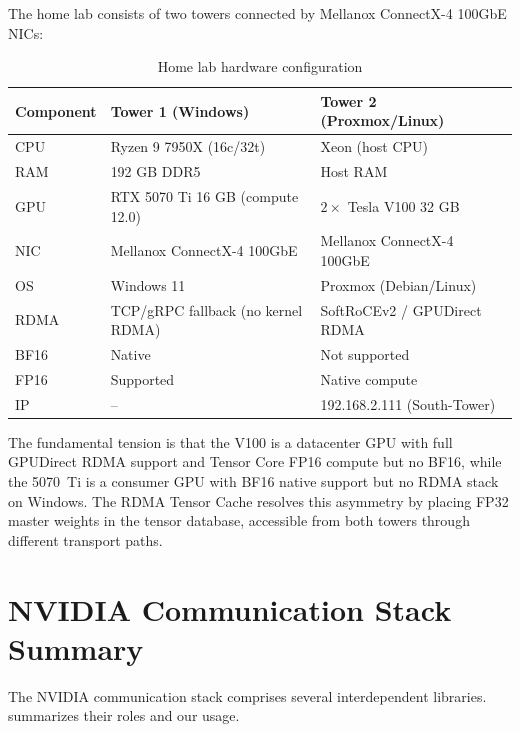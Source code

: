 \documentclass[11pt,letterpaper]{article}
\theoremstyle{definition}
\begin{document}
The home lab consists of two towers connected by Mellanox ConnectX-4 100GbE NICs:

\begin{table}[htbp]
\centering
\caption{Home lab hardware configuration}
\label{tab:hardware}
\begin{tabular}{@{}lll@{}}
\toprule
\textbf{Component} & \textbf{Tower 1 (Windows)} & \textbf{Tower 2 (Proxmox/Linux)} \\
\midrule
CPU & Ryzen 9 7950X (16c/32t) & Xeon (host CPU) \\
RAM & 192 GB DDR5 & Host RAM \\
GPU & RTX 5070 Ti 16 GB (compute 12.0) & $2\times$ Tesla V100 32 GB \\
NIC & Mellanox ConnectX-4 100GbE & Mellanox ConnectX-4 100GbE \\
OS & Windows 11 & Proxmox (Debian/Linux) \\
RDMA & TCP/gRPC fallback (no kernel RDMA) & SoftRoCEv2 / GPUDirect RDMA \\
BF16 & Native & Not supported \\
FP16 & Supported & Native compute \\
IP & -- & 192.168.2.111 (South-Tower) \\
\bottomrule
\end{tabular}
\end{table}

The fundamental tension is that the V100 is a datacenter GPU with full GPUDirect RDMA support and Tensor Core FP16 compute but no BF16, while the 5070~Ti is a consumer GPU with BF16 native support but no RDMA stack on Windows. The RDMA Tensor Cache resolves this asymmetry by placing FP32 master weights in the tensor database, accessible from both towers through different transport paths.

\section{NVIDIA Communication Stack Summary}
\label{sec:nvidia-ecosystem}

The NVIDIA communication stack comprises several interdependent libraries.  summarizes their roles and our usage.
\end{document}
